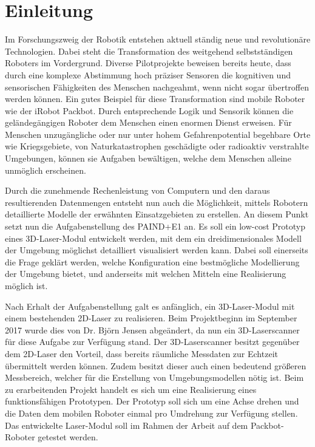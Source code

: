 
\chapter{Einleitung}

Im Forschungszweig der Robotik entstehen aktuell ständig neue und revolutionäre Technologien. Dabei steht die Transformation des weitgehend selbstständigen Roboters im Vordergrund. Diverse Pilotprojekte beweisen bereits heute, dass durch eine komplexe Abstimmung hoch präziser Sensoren die kognitiven und sensorischen Fähigkeiten des Menschen nachgeahmt, wenn nicht sogar übertroffen werden können. Ein gutes Beispiel für diese Transformation sind mobile Roboter wie der iRobot Packbot. Durch entsprechende Logik und Sensorik können die geländegängigen Roboter dem Menschen einen enormen Dienst erweisen. Für Menschen unzugängliche oder nur unter hohem Gefahrenpotential begehbare Orte wie Kriegsgebiete, von Naturkatastrophen geschädigte oder radioaktiv verstrahlte Umgebungen, können sie Aufgaben bewältigen, welche dem Menschen alleine unmöglich erscheinen.

Durch die zunehmende Rechenleistung von Computern und den daraus resultierenden Datenmengen entsteht nun auch die Möglichkeit, mittels Robotern detaillierte Modelle der erwähnten Einsatzgebieten zu erstellen. An diesem Punkt setzt nun die Aufgabenstellung des PAIND+E1 an. Es soll ein low-cost Prototyp eines 3D-Laser-Modul entwickelt werden, mit dem ein dreidimensionales Modell der Umgebung möglichst detailliert visualisiert werden kann. Dabei soll einerseits die Frage geklärt werden, welche Konfiguration eine bestmögliche Modellierung der Umgebung bietet, und anderseits mit welchen Mitteln eine Realisierung möglich ist.

Nach Erhalt der Aufgabenstellung galt es anfänglich, ein 3D-Laser-Modul mit einem bestehenden 2D-Laser zu realisieren. Beim Projektbeginn im September 2017 wurde dies von Dr. Björn Jensen abgeändert, da nun ein 3D-Laserscanner für diese Aufgabe zur Verfügung stand. Der 3D-Laserscanner besitzt gegenüber dem 2D-Laser den Vorteil, dass bereits räumliche Messdaten zur Echtzeit übermittelt werden können. Zudem besitzt dieser auch einen bedeutend größeren Messbereich, welcher für die Erstellung von Umgebungsmodellen nötig ist. Beim zu erarbeitenden Projekt handelt es sich um eine Realisierung eines funktionsfähigen Prototypen. Der Prototyp soll sich um eine Achse drehen und die Daten dem mobilen Roboter einmal pro Umdrehung zur Verfügung stellen. Das entwickelte Laser-Modul soll im Rahmen der Arbeit auf dem Packbot-Roboter getestet werden.

